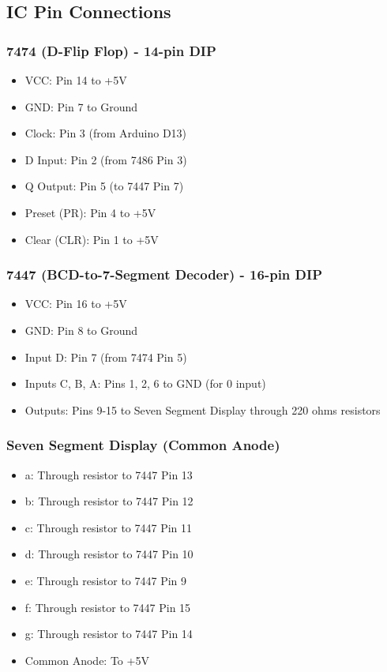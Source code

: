 \documentclass[12pt,a4paper]{article}
\begin{document}
\subsection*{IC Pin Connections}

\subsubsection*{7474 (D-Flip Flop) - 14-pin DIP}
\begin{itemize}
  \item VCC: Pin 14 to +5V
  \item GND: Pin 7 to Ground
  \item Clock: Pin 3 (from Arduino D13)
  \item D Input: Pin 2 (from 7486 Pin 3)
  \item Q Output: Pin 5 (to 7447 Pin 7)
  \item Preset (PR): Pin 4 to +5V
  \item Clear (CLR): Pin 1 to +5V
\end{itemize}

\subsubsection*{7447 (BCD-to-7-Segment Decoder) - 16-pin DIP}
\begin{itemize}
  \item VCC: Pin 16 to +5V
  \item GND: Pin 8 to Ground
  \item Input D: Pin 7 (from 7474 Pin 5)
  \item Inputs C, B, A: Pins 1, 2, 6 to GND (for 0 input)
  \item Outputs: Pins 9-15 to Seven Segment Display through 220 ohms resistors
\end{itemize}

\subsubsection*{Seven Segment Display (Common Anode)}
\begin{itemize}
  \item a: Through resistor to 7447 Pin 13
  \item b: Through resistor to 7447 Pin 12
  \item c: Through resistor to 7447 Pin 11
  \item d: Through resistor to 7447 Pin 10
  \item e: Through resistor to 7447 Pin 9
  \item f: Through resistor to 7447 Pin 15
  \item g: Through resistor to 7447 Pin 14
  \item Common Anode: To +5V
\end{itemize}
\end{document}
